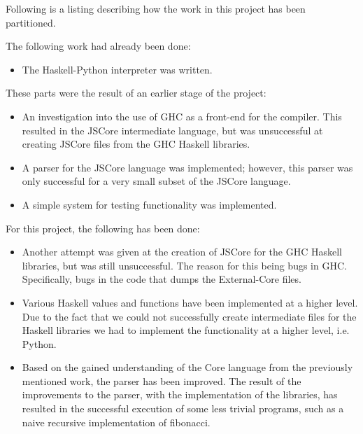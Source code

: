 Following is a listing describing how the work in this project has been
partitioned.

The following work had already been done:
\begin{itemize}

\item The Haskell-Python\cite{haskellpython} interpreter was written.

\end{itemize}

These parts were the result of an earlier stage of the project:
\begin{itemize}

\item An investigation into the use of GHC as a front-end for the compiler.
This resulted in the JSCore intermediate language, but was unsuccessful
at creating JSCore files from the GHC Haskell libraries.

\item A parser for the JSCore language was implemented; however, this 
parser was only successful for a very small subset of the JSCore language.

\item A simple system for testing functionality was implemented.

\end{itemize}

For this project, the following has been done:
\begin{itemize}

\item Another attempt was given at the creation of JSCore for the GHC 
Haskell libraries, but was still unsuccessful. The reason for this being
bugs in GHC. Specifically, bugs in the code that dumps the External-Core
files.

\item Various Haskell values and functions have been implemented at a higher
level. Due to the fact that we could not successfully create intermediate
files for the Haskell
libraries we had to implement the functionality at a higher level, i.e. 
Python.

\item Based on the gained understanding of the Core language from the
previously mentioned work, the parser has been improved. The result of 
the improvements to the parser, with the implementation of the libraries,
has resulted in the successful execution of some less trivial programs,
such as a naive recursive implementation of fibonacci.

\end{itemize}

